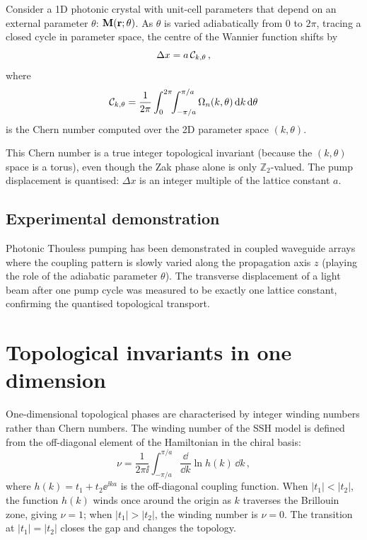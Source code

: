 Consider a 1D photonic crystal with unit-cell parameters that depend on
an external parameter $\theta$:
$\mathbf{M}(\mathbf{r};\theta)$.  As $\theta$ is varied adiabatically from $0$ to
$2\pi$, tracing a closed cycle in parameter space, the centre of the
Wannier function shifts by
\begin{equation}\label{eq:ch14-thouless-pump-displacement}
  \Delta x = a\,\mathcal{C}_{k,\theta}\,,
\end{equation}
where
\begin{equation}\label{eq:ch14-pump-chern}
  \mathcal{C}_{k,\theta} = \frac{1}{2\pi}\int_0^{2\pi}\!\!\int_{-\pi/a}^{\pi/a}
  \Omega_n(k,\theta)\,\mathrm{d} k\,\mathrm{d}\theta
\end{equation}
is the Chern number computed over the 2D parameter space $(k,\theta)$.

This Chern number is a true integer topological invariant (because the
$(k,\theta)$ space is a torus), even though the Zak phase alone is
only $\mathbb{Z}_2$-valued.  The pump displacement is quantised:
$\Delta x$ is an integer multiple of the lattice constant $a$.

\subsection{Experimental demonstration}
\label{sec:ch14-pump-experiment}

Photonic Thouless pumping has been demonstrated in coupled waveguide
arrays where the coupling pattern is slowly varied along the
propagation axis $z$ (playing the role of the adiabatic parameter
$\theta$).  The transverse displacement of a light beam after one pump
cycle was measured to be exactly one lattice constant, confirming the
quantised topological transport.

\section{Topological invariants in one dimension}
\label{sec:ch14-1d-invariants}

One-dimensional topological phases are characterised by integer
winding numbers rather than Chern numbers.  The winding number of
the SSH model is defined from the off-diagonal element of the
Hamiltonian in the chiral basis:
\begin{equation}\label{eq:ch14-winding-explicit}
  \nu = \frac{1}{2\pi\ii}\int_{-\pi/a}^{\pi/a}
  \frac{\dd}{\dd k}\ln h(k)\,\dd k\,,
\end{equation}
where $h(k)=t_1+t_2\ee^{\ii ka}$ is the off-diagonal coupling
function.  When $|t_1|<|t_2|$, the function $h(k)$ winds once around
the origin as $k$ traverses the Brillouin zone, giving $\nu=1$;
when $|t_1|>|t_2|$, the winding number is $\nu=0$.  The transition
at $|t_1|=|t_2|$ closes the gap and changes the topology.


